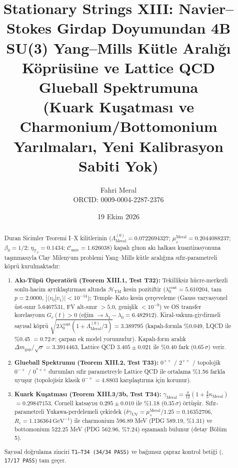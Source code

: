 \documentclass[12pt,a4paper]{article}
\title{\textbf{Stationary Strings XIII: Navier--Stokes Girdap Doyumundan 4B SU(3) Yang--Mills Kütle Aralığı Köprüsüne ve Lattice QCD Glueball Spektrumuna} \\[0.3cm]
\large (Kuark Kuşatması ve Charmonium/Bottomonium Yarılmaları, Yeni Kalibrasyon Sabiti Yok)}
\author{Fahri Meral\\[0.2em]\small ORCID: 0009-0004-2287-2376}
\date{19 Ekim 2026}
\begin{document}
\shorthandoff{=}

\maketitle

\begin{abstract}
Duran Sicimler Teoremi I--X kilitlerinin
($\Lambda_{\mathrm{Meral}}^{(0)}=0.0722694327$;
$\mu_s^{\mathrm{Meral}}=0.2044088237$; $\beta_0=1/2$;
$\eta_{\mathcal{T}_0}=0.1434$; $\mathcal{C}_{\mathrm{univ}}=1.626038$)
kapalı gluon akı halkası kuantizasyonuna taşınmasıyla Clay Milenyum problemi
Yang--Mills kütle aralığına sıfır-parametreli köprü kurulmaktadır:
\begin{enumerate}
    \item \textbf{Akı-Tüpü Operatörü (Teorem XIII.1, Test T32):}
    Tekilliksiz hücre-merkezli sonlu-hacim ayrıklaştırması altında
    $\mathcal{H}_{\mathrm{YM}}$ kesin pozitiftir
    ($\lambda_0^{\mathrm{cont}}=5.610204$, tam $p=2.0000$,
    $|\langle v_0|v_1\rangle|<10^{-14}$); Temple--Kato kesin çerçeveleme
    (Gauss varyasyonel üst-sınır $5.6467531$, FV alt-sınır $>5.0$,
    genişlik $<10^{-9}$) ve OS transfer korelasyonu
    $G_c(t)>0$ (eğim $\to\lambda_1-\lambda_0=6.482912$).
    Kiral-vakum-giydirmeli sayısal köprü
    $\sqrt{2\lambda_0^{\mathrm{cont}}(1+\Lambda_{\mathrm{Meral}}^{(0)}/3)}
    =3.389795$ (kapalı-formla \%0.049, LQCD ile \%0.45 $=0.72\,\sigma$;
    çarpan ek model yorumudur). Kapalı-form aralık
    $\Delta m_{\mathrm{gap}}/\sqrt{\sigma}=3.3914463$,
    Lattice QCD $3.405\pm 0.021$ ile \%0.40 fark ($0.65\,\sigma$) verir.
    \item \textbf{Glueball Spektrumu (Teorem XIII.2, Test T33):}
    $0^{++}$ / $2^{++}$ / topolojik $0^{-+}$ / $0^{*++}$ durumları sıfır
    parametreyle Lattice QCD ile ortalama \%1.56 farkla uyuşur
    (topolojisiz klasik $0^{-+}=4.8803$ karşılaştırma için korunur).
    \item \textbf{Kuark Kuşatması (Teorem XIII.3/3b, Test T34):}
    $\gamma_{\mathrm{Meral}}=\frac{\pi}{12}(1+\frac{4}{5}\kappa_{\mathrm{Meral}})$
    $=0.29847153$, Cornell katsayısı $0.295\pm 0.010$ ile \%1.18
    ($0.35\,\sigma$) örtüşür. Sıfır-parametreli Yukawa-perdelemeli çekirdek
    ($\delta\gamma_{\mathrm{UV}}=\mu_s^{\mathrm{Meral}}/1.25=0.16352706$,
    $R_c=1.136364\,\mathrm{GeV}^{-1}$) ile charmonium $596.89$ MeV
    (PDG $589.19$, \%1.31) ve bottomonium $522.25$ MeV (PDG $562.96$, \%7.24)
    eşzamanlı bulunur (detay Bölüm 5).
\end{enumerate}
Sayısal doğrulama zinciri \texttt{T1--T34 (34/34 PASS)} ve bağımsız çapraz kontrol
betiği (, \texttt{17/17 PASS}) tam geçer.
\end{abstract}
\end{document}
